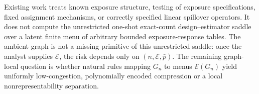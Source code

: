 Existing work treats known exposure structure, testing of exposure specifications, fixed assignment mechanisms, or correctly specified linear spillover operators. It does not compute the unrestricted one-shot exact-count design--estimator saddle over a latent finite menu of arbitrary bounded exposure-response tables. The ambient graph is not a missing primitive of this unrestricted saddle: once the analyst supplies \(\mathcal E\), the risk depends only on \((n,\mathcal E,\bar p)\). The remaining graph-local question is whether natural rules mapping \(G_n\) to menus \(\mathcal E(G_n)\) yield uniformly low-congestion, polynomially encoded compression or a local nonrepresentability separation.